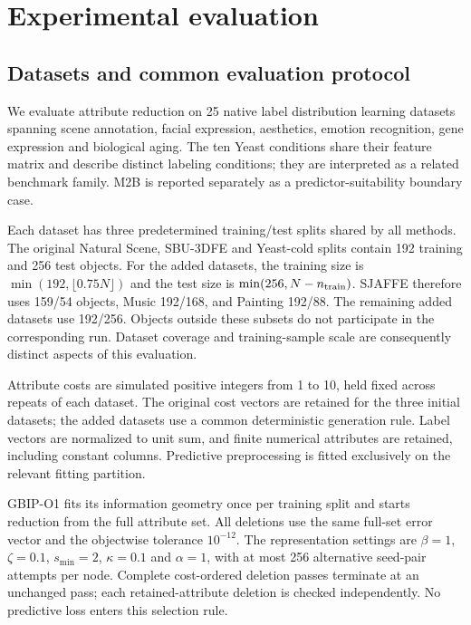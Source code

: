 \section{Experimental evaluation}
\label{sec:expanded-experiments}
\subsection{Datasets and common evaluation protocol}
We evaluate attribute reduction on 25 native label distribution learning datasets spanning scene annotation, facial expression, aesthetics, emotion recognition, gene expression and biological aging. The ten Yeast conditions share their feature matrix and describe distinct labeling conditions; they are interpreted as a related benchmark family. M2B is reported separately as a predictor-suitability boundary case.

Each dataset has three predetermined training/test splits shared by all methods. The original Natural Scene, SBU-3DFE and Yeast-cold splits contain 192 training and 256 test objects. For the added datasets, the training size is $\min(192,\lfloor0.75N\rfloor)$ and the test size is $\min(256,N-n_{\rm train})$. SJAFFE therefore uses 159/54 objects, Music 192/168, and Painting 192/88. The remaining added datasets use 192/256. Objects outside these subsets do not participate in the corresponding run. Dataset coverage and training-sample scale are consequently distinct aspects of this evaluation.

Attribute costs are simulated positive integers from 1 to 10, held fixed across repeats of each dataset. The original cost vectors are retained for the three initial datasets; the added datasets use a common deterministic generation rule. Label vectors are normalized to unit sum, and finite numerical attributes are retained, including constant columns. Predictive preprocessing is fitted exclusively on the relevant fitting partition.

GBIP-O1 fits its information geometry once per training split and starts reduction from the full attribute set. All deletions use the same full-set error vector and the objectwise tolerance $10^{-12}$. The representation settings are $\beta=1$, $\zeta=0.1$, $s_{\min}=2$, $\kappa=0.1$ and $\alpha=1$, with at most 256 alternative seed-pair attempts per node. Complete cost-ordered deletion passes terminate at an unchanged pass; each retained-attribute deletion is checked independently. No predictive loss enters this selection rule.

